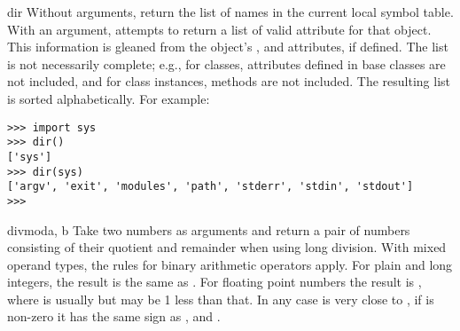 \begin{funcdesc}{dir}{}
  Without arguments, return the list of names in the current local
  symbol table.  With an argument, attempts to return a list of valid
  attribute for that object.  This information is gleaned from the
  object's ,  and 
  attributes, if defined.  The list is not necessarily complete; e.g.,
  for classes, attributes defined in base classes are not included,
  and for class instances, methods are not included.
  The resulting list is sorted alphabetically.  For example:

\begin{verbatim}
>>> import sys
>>> dir()
['sys']
>>> dir(sys)
['argv', 'exit', 'modules', 'path', 'stderr', 'stdin', 'stdout']
>>> 
\end{verbatim}
\end{funcdesc}

\begin{funcdesc}{divmod}{a, b}
  Take two numbers as arguments and return a pair of numbers consisting
  of their quotient and remainder when using long division.  With mixed
  operand types, the rules for binary arithmetic operators apply.  For
  plain and long integers, the result is the same as
  .
  For floating point numbers the result is , where  is usually  but may be 1 less than that.  In any case  is very close to , if
   is non-zero it has the same sign as
  , and .
\end{funcdesc}

